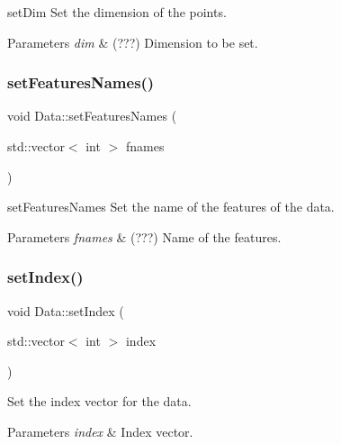 set\+Dim Set the dimension of the points. 


\begin{DoxyParams}{Parameters}
{\em dim} & (???) Dimension to be set. \\
\hline
\end{DoxyParams}
\mbox{\label{class_data_a2702b6464d7299c3b62e4eb4390fecd6}} 
\subsubsection{\texorpdfstring{set\+Features\+Names()}{setFeaturesNames()}}
{\footnotesize\ttfamily void Data\+::set\+Features\+Names (\begin{DoxyParamCaption}\item[{std\+::vector$<$ int $>$}]{fnames }\end{DoxyParamCaption})}



set\+Features\+Names Set the name of the features of the data. 


\begin{DoxyParams}{Parameters}
{\em fnames} & (???) Name of the features. \\
\hline
\end{DoxyParams}
\mbox{\label{class_data_ab2debdff651c70d26f84c9ac20f4dee6}} 
\subsubsection{\texorpdfstring{set\+Index()}{setIndex()}}
{\footnotesize\ttfamily void Data\+::set\+Index (\begin{DoxyParamCaption}\item[{std\+::vector$<$ int $>$}]{index }\end{DoxyParamCaption})}



Set the index vector for the data. 


\begin{DoxyParams}{Parameters}
{\em index} & Index vector. \\
\hline
\end{DoxyParams}
\mbox{\label{class_data_ad1f5969b33170e908334bd1ad6163b54}} 
